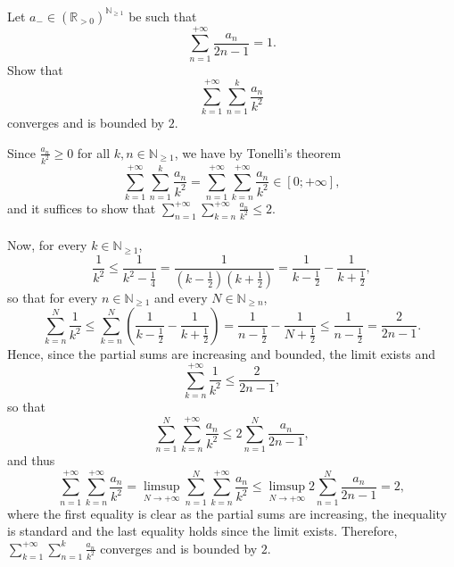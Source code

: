 \begin{problem}
    Let \( a_{-} \in \left(\mathbb{R}_{>0}\right)^{\mathbb{N}_{\geq 1}} \) be such that
    \[
        \sum_{n=1}^{+\infty} \frac{a_n}{2n-1} = 1.
    \]
    Show that
    \[
        \sum_{k=1}^{+\infty} \sum_{n=1}^{k} \frac{a_n}{k^2}
    \]
    converges and is bounded by \( 2 \).
\end{problem}
\begin{solution}
    Since \( \frac{a_n}{k^2} \geq 0 \) for all \( k, n \in \mathbb{N}_{\geq 1} \), we have by Tonelli's theorem
    \[
        \sum_{k=1}^{+\infty} \sum_{n=1}^{k} \frac{a_n}{k^2} = \sum_{n=1}^{+\infty} \sum_{k=n}^{+\infty} \frac{a_n}{k^2} \in \left[0;+\infty\right],
    \]
    and it suffices to show that \( \sum_{n=1}^{+\infty} \sum_{k=n}^{+\infty} \frac{a_n}{k^2} \leq 2 \).
    \\\\
    Now, for every \( k \in \mathbb{N}_{\geq 1} \),
    \[
        \frac{1}{k^2} \leq \frac{1}{k^2-\frac{1}{4}} = \frac{1}{\left(k-\frac{1}{2}\right)\left(k+\frac{1}{2}\right)} = \frac{1}{k-\frac{1}{2}} - \frac{1}{k+\frac{1}{2}},
    \]
    so that for every \( n \in \mathbb{N}_{\geq 1} \) and every \( N \in \mathbb{N}_{\geq n} \),
    \[
        \sum_{k=n}^{N} \frac{1}{k^2} \leq \sum_{k=n}^{N} \left(\frac{1}{k-\frac{1}{2}} - \frac{1}{k+\frac{1}{2}}\right) = \frac{1}{n-\frac{1}{2}} - \frac{1}{N+\frac{1}{2}} \leq \frac{1}{n-\frac{1}{2}}= \frac{2}{2n-1}.
    \]
    Hence, since the partial sums are increasing and bounded, the limit exists and
    \[
        \sum_{k=n}^{+\infty} \frac{1}{k^2} \leq \frac{2}{2n-1},
    \]
    so that
    \[
        \sum_{n=1}^{N} \sum_{k=n}^{+\infty} \frac{a_n}{k^2} \leq 2 \sum_{n=1}^{N} \frac{a_n}{2n-1},
    \]
    and thus
    \[
        \sum_{n=1}^{+\infty} \sum_{k=n}^{+\infty} \frac{a_n}{k^2} = \limsup_{N \to +\infty} \sum_{n=1}^{N} \sum_{k=n}^{+\infty} \frac{a_n}{k^2} \leq \limsup_{N \to +\infty} 2 \sum_{n=1}^{N} \frac{a_n}{2n-1} = 2,
    \]
    where the first equality is clear as the partial sums are increasing, the inequality is standard and the last equality holds since the limit exists. Therefore, \( \sum_{k=1}^{+\infty} \sum_{n=1}^{k} \frac{a_n}{k^2} \) converges and is bounded by \( 2 \).
\end{solution}
